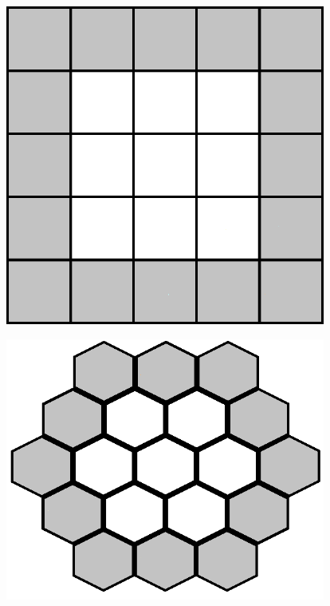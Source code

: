 \documentclass{article}
\newenvironment{Figure}
  {\par\medskip\noindent\minipage{\linewidth}}
  {\endminipage\par\medskip}
\begin{document}
\begin{multicols}{2}
\begin{Figure}
 \centering
 \includegraphics[width=0.79\textwidth]{imgs/extendedcartesian.png}
\label{fig:extcartesianstd}
\end{Figure}
\begin{Figure}
 \centering
 \includegraphics[width=0.79\textwidth]{imgs/extendedhexagonal.png}
\label{fig:exthexstd}
\end{Figure}
\begin{Figure}
 \centering

\end{Figure}
\end{multicols}
\end{document}
